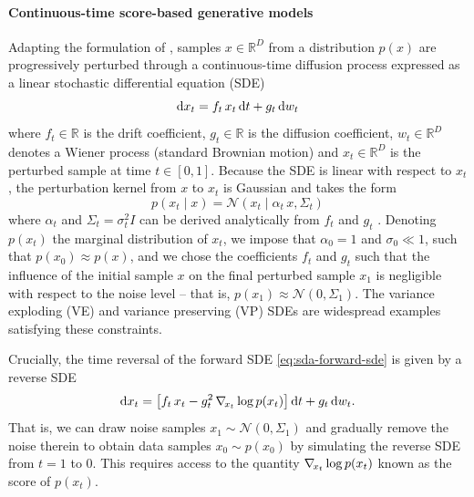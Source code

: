 \paragraph{Continuous-time score-based generative models}
Adapting the formulation of \textcite{song2021scorebased}, samples $x \in \mathbb{R}^D$ from a distribution $p(x)$ are progressively perturbed through a continuous-time diffusion process expressed as a linear stochastic differential equation (SDE)
\begin{equation} \label{eq:sda-forward-sde}
    \operatorname{d}\!{x_t} = f_t \, x_t \operatorname{d}\!{t} + g_t \operatorname{d}\!{w_t}
\end{equation}
where $f_t \in \mathbb{R}$ is the drift coefficient, $g_t \in \mathbb{R}$ is the diffusion coefficient, $w_t \in \mathbb{R}^D$ denotes a Wiener process (standard Brownian motion) and $x_t \in \mathbb{R}^D$ is the perturbed sample at time $t \in [0, 1]$. Because the SDE is linear with respect to $x_t$, the perturbation kernel from $x$ to $x_t$ is Gaussian and takes the form
\begin{equation}
    p(x_t \mid x) = \mathcal{N}(x_t \mid \alpha_t \, x, \Sigma_t)
\end{equation}
where $\alpha_t$ and $\Sigma_t = \sigma_t^2 I$ can be derived analytically from $f_t$ and $g_t$ \cite{sarkka2019applied, zhang2023fast}. Denoting $p(x_t)$ the marginal distribution of $x_t$, we impose that $\alpha_0 = 1$ and $\sigma_0 \ll 1$, such that $p(x_0) \approx p(x)$, and we chose the coefficients $f_t$ and $g_t$ such that the influence of the initial sample $x$ on the final perturbed sample $x_1$ is negligible with respect to the noise level -- that is, $p(x_1) \approx \mathcal{N}(0, \Sigma_1)$. The variance exploding (VE) and variance preserving (VP) SDEs \cite{song2019generative, ho2020denoising, song2021scorebased} are widespread examples satisfying these constraints.

Crucially, the time reversal of the forward SDE \eqref{eq:sda-forward-sde} is given by a reverse SDE \cite{anderson1982reversetime, song2021scorebased}
\begin{equation} \label{eq:sda-reverse-sde}
    \operatorname{d}\!{x_t} = \left[ f_t \, x_t - g_t^2 \, \nabla_{\!{x_t}} \log p(x_t) \right] \operatorname{d}\!{t} + g_t \operatorname{d}\!{w_t} .
\end{equation}
That is, we can draw noise samples $x_1 \sim \mathcal{N}(0, \Sigma_1)$ and gradually remove the noise therein to obtain data samples $x_0 \sim p(x_0)$ by simulating the reverse SDE from $t = 1$ to $0$. This requires access to the quantity $\nabla_{\!{x_t}} \log p(x_t)$ known as the score of $p(x_t)$.

